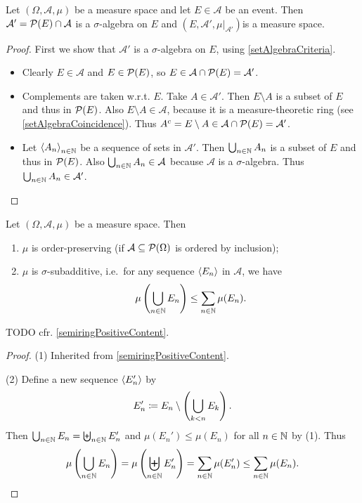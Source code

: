 \begin{lemma} \label{submeasurespace}
Let $(\Omega,\mathcal{A},\mu)$ be a measure space and let $E\in\mathcal{A}$ be an event. Then $\mathcal{A}' = \operatorname{\mathcal{P}}(E)\cap\mathcal{A}$ is a $\sigma$-algebra on $E$ and $(E,\mathcal{A}',\mu|_{\mathcal{A}'})$is a measure space.
\end{lemma}
\begin{proof}
First we show that $\mathcal{A}'$ is a $\sigma$-algebra on $E$, using \ref{setAlgebraCriteria}.
\begin{itemize}
\item Clearly $E\in \mathcal{A}$ and $E\in\operatorname{\mathcal{P}}(E)$, so $E\in\mathcal{A}\cap \operatorname{\mathcal{P}}(E) = \mathcal{A}'$.
\item Complements are taken w.r.t. $E$. Take $A\in \mathcal{A}'$. Then $E\setminus A$ is a subset of $E$ and thus in $\operatorname{\mathcal{P}}(E)$. Also $E\setminus A\in \mathcal{A}$, because it is a measure-theoretic ring (see \ref{setAlgebraCoincidence}). Thus $A^c = E\setminus A \in \mathcal{A}\cap \operatorname{\mathcal{P}}(E) = \mathcal{A}'$.
\item Let $\left\langle A_n \right\rangle_{n\in \mathbb{N}}$ be a sequence of sets in $\mathcal{A}'$. Then $\bigcup_{n\in \mathbb{N}}A_n$ is a subset of $E$ and thus in $\operatorname{\mathcal{P}}(E)$. Also $\bigcup_{n\in \mathbb{N}}A_n\in\mathcal{A}$ because $\mathcal{A}$ is a $\sigma$-algebra. Thus $\bigcup_{n\in \mathbb{N}}A_n\in\mathcal{A}'$.
\end{itemize}
\end{proof}

\begin{proposition} \label{measureProperties}
Let $(\Omega, \mathcal{A}, \mu)$ be a measure space. Then
\begin{enumerate}
\item $\mu$ is order-preserving (if $\mathcal{A}\subseteq \operatorname{\mathcal{P}}(\Omega)$ is ordered by inclusion);
\item $\mu$ is $\sigma$-subadditive, i.e.\ for any sequence $\left\langle E_n \right\rangle$ in $\mathcal{A}$, we have
\[ \mu\left(\bigcup_{n\in\mathbb{N}}E_n\right) \leq \sum_{n\in\mathbb{N}}\mu(E_n). \]
\end{enumerate}
\end{proposition}
TODO cfr. \ref{semiringPositiveContent}.
\begin{proof}
(1) Inherited from \ref{semiringPositiveContent}.

(2) Define a new sequence $\left\langle E_n' \right\rangle$ by
\[ E_n' \coloneqq E_n\setminus \left(\bigcup_{k<n}E_k\right). \]
Then $\bigcup_{n\in\mathbb{N}}E_n = \biguplus_{n\in\mathbb{N}}E_n'$ and $\mu(E_n')\leq \mu(E_n)$ for all $n\in \mathbb{N}$ by (1). Thus
\[ \mu\left(\bigcup_{n\in\mathbb{N}}E_n\right) = \mu\left(\biguplus_{n\in\mathbb{N}}E_n'\right) =  \sum_{n\in\mathbb{N}}\mu(E'_n) \leq \sum_{n\in\mathbb{N}}\mu(E_n). \]
\end{proof}

